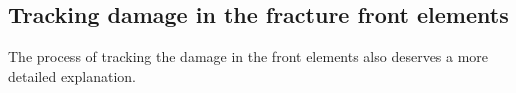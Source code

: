 \subsection{Tracking damage in the fracture front elements}

The process of tracking the damage in the front elements also deserves a more detailed explanation. 


    


